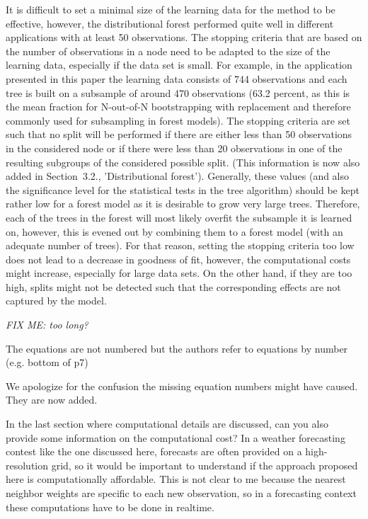 \documentclass[american,foldmarks=false,noconfig]{uibklttr}
\newenvironment{review}{\fontshape{\itdefault}\fontseries{\bfdefault} \selectfont \smallskip}{\par}
\begin{document}
It is difficult to set a minimal size of the learning data for
the method to be effective, however, the distributional forest
performed quite well in different applications with at least
50 observations. 
The stopping criteria that are based on the number of 
observations in a node need to be adapted to the size of the
learning data, especially if the data set is small.
For example, in the application presented in this paper the 
learning data consists of 744 observations and each tree is built
on a subsample of around 470 observations (63.2 percent, as 
this is the mean fraction for N-out-of-N bootstrapping with 
replacement and therefore commonly used for subsampling
in forest models). 
The stopping criteria are set such that no split will be performed 
if there are either less than 50 observations 
in the considered node or if there were less than 20 observations in 
one of the resulting subgroups of the considered possible split.
(This information is now also added in Section~3.2., 'Distributional forest').
Generally, these values (and also the significance level for
the statistical tests in the tree algorithm) should be kept 
rather low for a forest model as it is desirable to grow very 
large trees. Therefore, each of the trees in the forest will 
most likely overfit the subsample it is learned on, however, this 
is evened out by combining them to a forest model (with an adequate 
number of trees). For that reason, setting the stopping criteria too 
low does not lead to a decrease in goodness of fit, however, the 
computational costs might increase, especially for large data sets. 
On the other hand, if they are too high, splits might not be detected 
such that the corresponding effects are not captured by the model.

\textit{FIX ME: too long?}


\begin{review}
The equations are not numbered but the authors refer to equations 
by number (e.g. bottom of p7)
\end{review}

We apologize for the confusion the missing equation numbers 
might have caused. They are now added.

\begin{review}
In the last section where computational details are discussed, 
can you also provide some information on the computational cost? 
In a weather forecasting contest like the one discussed here, 
forecasts are often provided on a high-resolution grid, 
so it would be important to understand if the approach 
proposed here is computationally affordable. This is not clear 
to me because the nearest neighbor weights are specific 
to each new observation, so in a forecasting context these 
computations have to be done in realtime.
\end{review}
\end{document}
